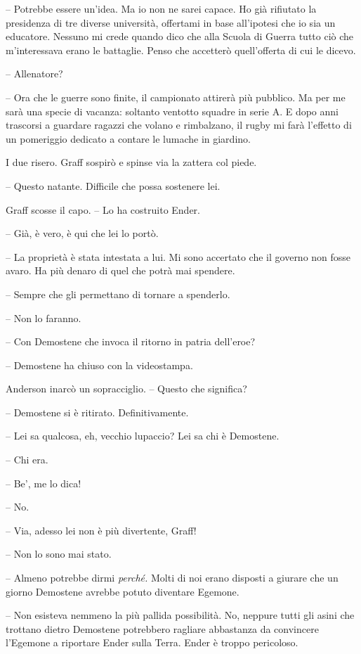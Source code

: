 {-- Potrebbe essere un'idea. Ma io non ne sarei capace. Ho già rifiutato
	la presidenza di tre diverse università, offertami in base all'ipotesi
	che io sia un educatore. Nessuno mi crede quando dico che alla Scuola di
	Guerra tutto ciò che m'interessava erano le battaglie. Penso che
	accetterò quell'offerta di cui le dicevo.}

{-- Allenatore?}

{-- Ora che le guerre sono finite, il campionato attirerà più pubblico.
	Ma per me sarà una specie di vacanza: soltanto ventotto squadre in serie
	A. E dopo anni trascorsi a guardare ragazzi che volano e rimbalzano, il
	rugby mi farà l'effetto di un pomeriggio dedicato a contare le lumache
	in giardino.}

{I due risero. Graff sospirò e spinse via la zattera col piede.}

{-- Questo natante. Difficile che possa sostenere lei.}

{Graff scosse il capo. -- Lo ha costruito Ender.}

{-- Già, è vero, è qui che lei lo portò.}

{-- La proprietà è stata intestata a lui. Mi sono accertato che il
	governo non fosse avaro. Ha più denaro di quel che potrà mai spendere.}

{-- Sempre che gli permettano di tornare a spenderlo.}

{-- Non lo faranno.}

{-- Con Demostene che invoca il ritorno in patria dell'eroe?}

{-- Demostene ha chiuso con la videostampa.}

{Anderson inarcò un sopracciglio. -- Questo che significa?}

{-- Demostene si è ritirato. Definitivamente.}

{-- Lei sa qualcosa, eh, vecchio lupaccio? Lei sa chi è Demostene.}

{-- Chi era.}

{-- Be', me lo dica!}

{-- No.}

{-- Via, adesso lei non è più divertente, Graff!}

{-- Non lo sono mai stato.}

{-- Almeno potrebbe dirmi \emph{perché.} Molti di noi erano disposti a
	giurare che un giorno Demostene avrebbe potuto diventare Egemone.}

{-- Non esisteva nemmeno la più pallida possibilità. No, neppure tutti
	gli asini che trottano dietro Demostene potrebbero ragliare abbastanza
	da convincere l'Egemone a riportare Ender sulla Terra. Ender è troppo
	pericoloso.}

